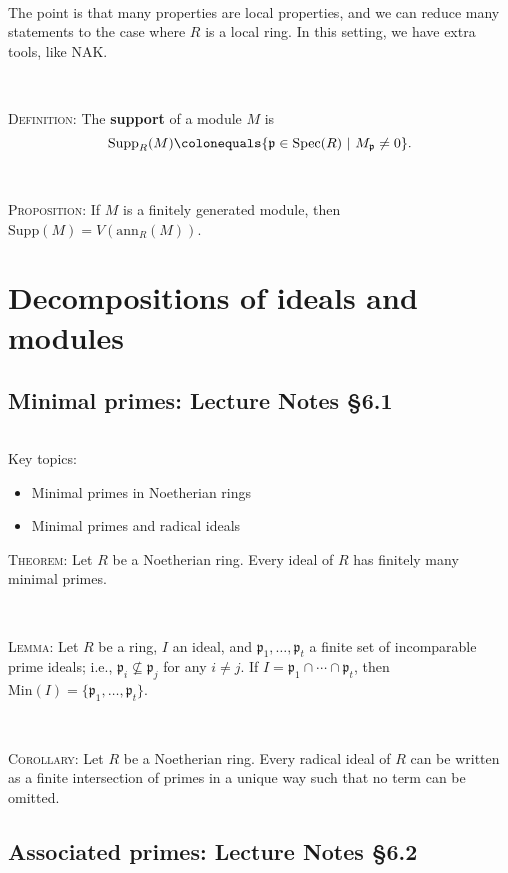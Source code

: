 \documentclass[12pt]{amsart}
\newcommand{\p}{\mathfrak{p}}
\newcommand{\Spec}{\mathrm{Spec}}
\newcommand{\Min}{\mathrm{Min}}
\newcommand{\ann}{\mathrm{ann}}
\newcommand{\0}{$\phantom{.}$}
\newcommand{\1}{\mathbbm{1}}
\newcommand\ceq{\colonequals}
\begin{document}
\

\noindent The point is that many properties are local properties, and we can reduce many statements to the case where $R$ is a local ring. In this setting, we have extra tools, like NAK.

\

\noindent \textsc{Definition:} The \textbf{support} of a module $M$ is
\[ \mathrm{Supp}_R(M)\ceq \{ \p \in \Spec(R) \ | \ M_{\p} \neq 0\}.\]

\

\noindent \textsc{Proposition:} If $M$ is a finitely generated module, then $\mathrm{Supp}(M) = V(\ann_R(M))$.


\newpage

\section{Decompositions of ideals and modules}
\setcounter{subsection}{23}

 \subsection{Minimal primes: Lecture Notes \S6.1}\0
 
  \begin{framed} Key topics:
\begin{itemize}
\item Minimal primes in Noetherian rings
\item Minimal primes and radical ideals
\end{itemize}
\end{framed}
 

\noindent \textsc{Theorem:} Let $R$ be a Noetherian ring. Every ideal of $R$ has finitely many minimal primes.

\

\noindent \textsc{Lemma:} Let $R$ be a ring, $I$ an ideal, and $\p_1,\dots,\p_t$ a finite set of incomparable prime ideals; i.e., $\p_i \not\subseteq \p_j$ for any $i\neq j$. If $I = \p_1 \cap \cdots \cap \p_t$, then $\Min(I) = \{\p_1,\dots,\p_t \}$.

\

\noindent \textsc{Corollary:} Let $R$ be a Noetherian ring. Every radical ideal of $R$ can be written as a finite intersection of primes in a unique way such that no term can be omitted.


\newpage

 \subsection{Associated primes: Lecture Notes \S6.2}\0
 
\end{document}
